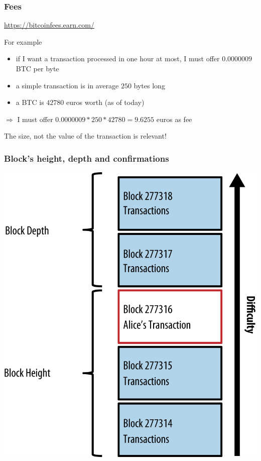 \documentclass[11pt]{beamer}  %
\begin{document}
\begin{frame}\frametitle{Fees}

  \begin{center}
    \url{https://bitcoinfees.earn.com/}
  \end{center}

  \bigskip
  \begin{greenbox}{For example}
    \begin{itemize}
    \item if I want a transaction processed in one hour at most, I must offer $0.0000009$ BTC per byte
    \item a simple transaction is in average $250$ bytes long
    \item a BTC is $42780$ euros worth (as of today)
    \end{itemize}
    \begin{center}
      $\Rightarrow$ I must offer $0.0000009 * 250 * 42780=9.6255$ euros as fee
    \end{center}
  \end{greenbox}

  \bigskip
  \begin{redbox}{}
    \begin{center}
      The size, not the value of the transaction is relevant!
    \end{center}
  \end{redbox}

\end{frame}

\begin{frame}\frametitle{Block's height, depth and confirmations}

  \begin{center}
    \includegraphics[scale=1,clip=false]{pictures/mbc2_0209.png}
  \end{center}

\end{frame}
\end{document}
